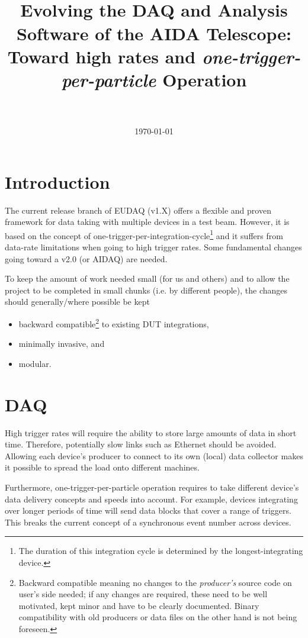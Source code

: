 \documentclass[paper=a4, fontsize=11pt]{scrartcl}	%
\title{
		\usefont{OT1}{bch}{b}{n}
		\horrule{0.5pt} \\[0.4cm]
		\huge Evolving the DAQ and
                Analysis Software of the AIDA Telescope: Toward high
                rates and
                \textit{one-trigger-per-particle} Operation\\
		\horrule{2pt} \\[0.5cm]
}
\author{}
\date{\today}
\numberwithin{equation}{section}		%
\numberwithin{figure}{section}			%
\numberwithin{table}{section}           	%
\begin{document}
 

\maketitle
\section{Introduction}
The current release branch of EUDAQ (v1.X) offers a flexible and proven
framework for data taking with multiple devices in a test
beam. However, it is based on the concept of
one-trigger-per-integration-cycle\footnote{The duration of this
  integration cycle is determined by the longest-integrating device.}
and it suffers from data-rate limitations when going to high trigger
rates. Some fundamental changes going toward a v2.0 (or AIDAQ) are
needed.

To keep the amount of work needed small (for us and others) and to allow the project to
be completed in small chunks (i.e. by different people), the changes
should generally/where possible be kept
\begin{itemize}
\item backward compatible\footnote{Backward compatible meaning no
    changes to the \emph{producer's} source code on user's side needed; if any
    changes are required, these need to be well motivated, kept minor and
    have to be clearly documented. Binary compatibility with old producers or
    data files on the other hand is not being foreseen.} to existing DUT integrations,
\item minimally invasive, and
\item modular.
\end{itemize}

\section{DAQ}
\label{sec:daq}
High trigger rates will require the ability to store large amounts of
data in short time. Therefore, potentially slow links such as Ethernet
should be avoided. Allowing each device's producer to connect to its
own (local) data collector makes it possible to spread the load onto
different machines.

Furthermore, one-trigger-per-particle operation requires to take
different device's data delivery concepts and speeds into
account. For example, devices integrating over longer periods of time
will send data blocks that cover a range of triggers. This breaks the
current concept of a synchronous event number across devices.
\end{document}
